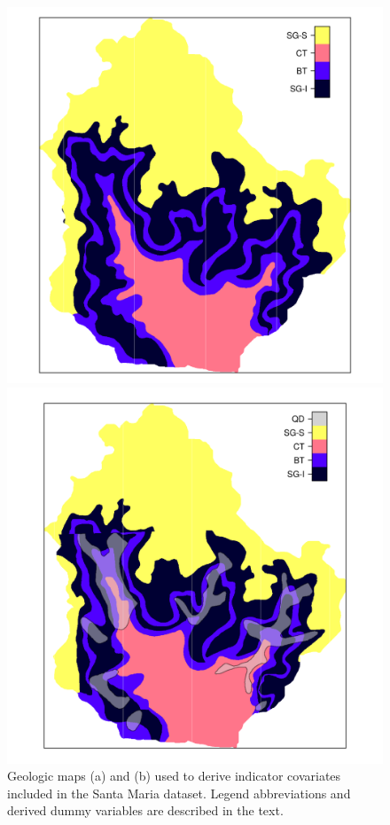 \begin{figure}[!ht]
\centering
\begin{minipage}[b]{0.45\textwidth}
\subcaption{}
\centering
\includegraphics[width = \textwidth]{fig/chap05-geo-old}
\end{minipage}
\begin{minipage}[b]{0.45\textwidth}
\subcaption{}
\centering
\includegraphics[width = \textwidth]{fig/chap05-geo-new}
\end{minipage} 
\caption[Geologic maps included in the Santa Maria dataset.]{Geologic maps (a) \geoOld{} and (b) \geoNew{} 
used 
to derive indicator covariates included in the Santa Maria dataset. Legend abbreviations and derived dummy 
variables are described in the text.}
\label{fig:chap05-geo-maps}
\end{figure}

